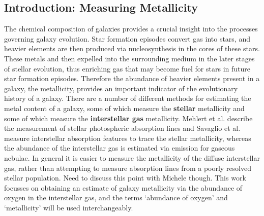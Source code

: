 \documentclass{literature}
\begin{document}
\subsection{Introduction: Measuring Metallicity}\label{sub:intro_measure}
The chemical composition of galaxies provides a crucial insight into the processes governing galaxy evolution. Star formation episodes convert gas into stars, and heavier elements are then produced via nucleosynthesis in the cores of these stars. These metals and then expelled into the surrounding medium in the later stages of stellar evolution, thus enriching gas that may become fuel for stars in future star formation episodes. Therefore the abundance of heavier elements present in a galaxy, the metallicity, provides an important indicator of the evolutionary history of a galaxy. There are a number of different methods for estimating the metal content of a galaxy, some of which measure the \textbf{stellar} metallicity and some of which measure the \textbf{interstellar gas} metallicity. Mehlert \citep{Mehlert_2002} et al. describe the measurement of stellar photospheric absorption lines and Savaglio \citep{Savaglio_2004} et al. measure interstellar absorption features to trace the stellar metallicity, whereas the abundance of the interstellar gas is estimated via emission for gaseous nebulae. In general it is easier to measure the metallicity of the diffuse interstellar gas, rather than attempting to measure absorption lines from a poorly resolved stellar population. Need to discuss this point with Michele though. This work focusses on obtaining an estimate of galaxy metallicity via the abundance of oxygen in the interstellar gas, and the terms `abundance of oxygen' and `metallicity' will be used interchangeably. \\
\end{document}
